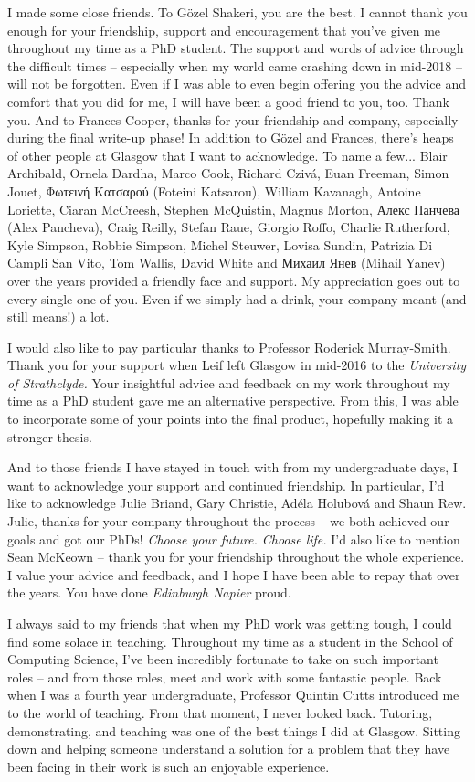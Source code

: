 \begin{preamble}
I made some close friends. To G\"{o}zel Shakeri, you are the best. I cannot thank you enough for your friendship, support and encouragement that you've given me throughout my time as a PhD student. The support and words of advice through the difficult times -- especially when my world came crashing down in mid-2018 -- will not be forgotten. Even if I was able to even begin offering you the advice and comfort that you did for me, I will have been a good friend to you, too. Thank you. And to Frances Cooper, thanks for your friendship and company, especially during the final write-up phase! In addition to G\"{o}zel and Frances, there's heaps of other people at Glasgow that I want to acknowledge. To name a few... Blair Archibald, Ornela Dardha, Marco Cook, Richard Cziv\'{a}, Euan Freeman, Simon Jouet, Φωτεινή Κατσαρού (Foteini Katsarou), William Kavanagh, Antoine Loriette, Ciaran McCreesh, Stephen McQuistin, Magnus Morton, Алекс Панчева (Alex Pancheva), Craig Reilly, Stefan Raue, Giorgio Roffo, Charlie Rutherford, Kyle Simpson, Robbie Simpson, Michel Steuwer, Lovisa Sundin, Patrizia Di Campli San Vito, Tom Wallis, David White and Михаил Янев (Mihail Yanev) over the years provided a friendly face and support. My appreciation goes out to every single one of you. Even if we simply had a drink, your company meant (and still means!) a lot.

I would also like to pay particular thanks to Professor Roderick Murray-Smith. Thank you for your support when Leif left Glasgow in mid-2016 to the \emph{University of Strathclyde.} Your insightful advice and feedback on my work throughout my time as a PhD student gave me an alternative perspective. From this, I was able to incorporate some of your points into the final product, hopefully making it a stronger thesis.

And to those friends I have stayed in touch with from my undergraduate days, I want to acknowledge your support and continued friendship. In particular, I'd like to acknowledge Julie Briand, Gary Christie, Ad\'{e}la Holubov\'{a} and Shaun Rew. Julie, thanks for your company throughout the process -- we both achieved our goals and got our PhDs! \emph{Choose your future. Choose life.} I'd also like to mention Sean McKeown -- thank you for your friendship throughout the whole experience. I value your advice and feedback, and I hope I have been able to repay that over the years. You have done \emph{Edinburgh Napier} proud.

I always said to my friends that when my PhD work was getting tough, I could find some solace in teaching. Throughout my time as a student in the School of Computing Science, I've been incredibly fortunate to take on such important roles -- and from those roles, meet and work with some fantastic people. Back when I was a fourth year undergraduate, Professor Quintin Cutts introduced me to the world of teaching. From that moment, I never looked back. Tutoring, demonstrating, and teaching was one of the best things I did at Glasgow. Sitting down and helping someone understand a solution for a problem that they have been facing in their work is such an enjoyable experience.


\end{preamble}
